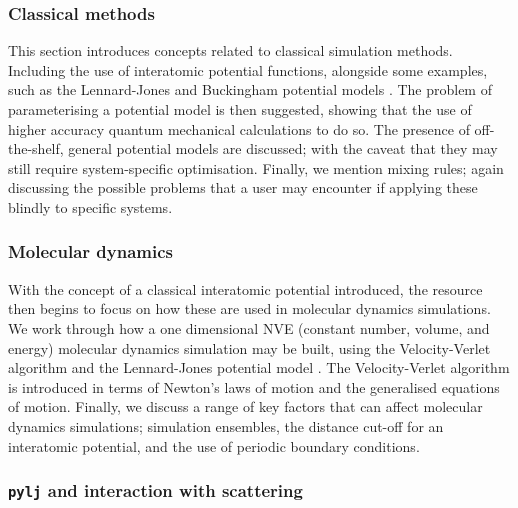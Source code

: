 \subsubsection{Classical methods}

This section introduces concepts related to classical simulation methods.
Including the use of interatomic potential functions, alongside some examples, such as the Lennard-Jones and Buckingham potential models \cite{lennard-jones_determination_1924,buckingham_classical_1938}.
The problem of parameterising a potential model is then suggested, showing that the use of higher accuracy quantum mechanical calculations to do so.
The presence of off-the-shelf, general potential models are discussed; with the caveat that they may still require system-specific optimisation.
Finally, we mention mixing rules; again discussing the possible problems that a user may encounter if applying these blindly to specific systems.

\subsubsection{Molecular dynamics}

With the concept of a classical interatomic potential introduced, the resource then begins to focus on how these are used in molecular dynamics simulations.
We work through how a one dimensional NVE (constant number, volume, and energy) molecular dynamics simulation may be built, using the Velocity-Verlet algorithm and the Lennard-Jones potential model \cite{swope_computer_1982,lennard-jones_determination_1924}.
The Velocity-Verlet algorithm is introduced in terms of Newton's laws of motion and the generalised equations of motion.
Finally, we discuss a range of key factors that can affect molecular dynamics simulations; simulation ensembles, the distance cut-off for an interatomic potential, and the use of periodic boundary conditions.

\subsubsection{\texttt{pylj} and interaction with scattering}

